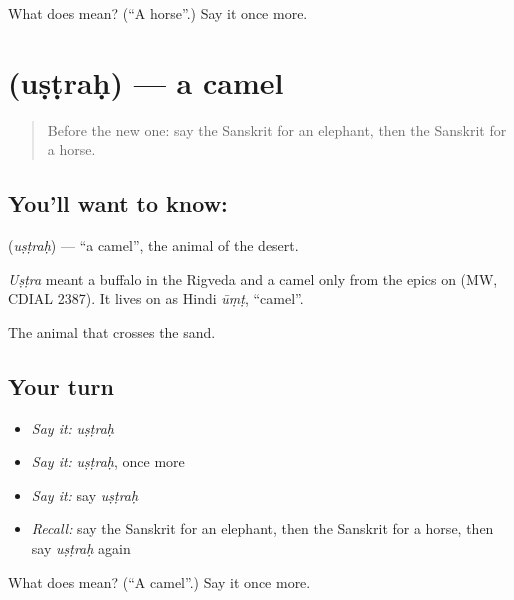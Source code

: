 \begin{tcolorbox}[breakable,colback=teal!4,colframe=teal!35!black,title={Before you move on}]
What does  mean? (\textquotedblleft{}A horse\textquotedblright{}.) Say it once more.
\end{tcolorbox}
\section[\texorpdfstring{\sk{उष्ट्रः} (uṣṭraḥ)}{उष्ट्रः (uṣṭraḥ)}]{ (uṣṭraḥ) — a camel}

\label{lesson:SA-C79-camel}



\begin{quote}
Before the new one: say the Sanskrit for an elephant, then the Sanskrit for a horse.
\end{quote}

\subsection*{You'll want to know: }
\textbf{} (\emph{uṣṭraḥ}) — \textquotedblleft{}a camel\textquotedblright{}, the animal of the desert.

\begin{cousinweb}
\emph{Uṣṭra} meant a buffalo in the Rigveda and a camel only from the epics on (MW, CDIAL 2387). It lives on as Hindi \emph{ūṃṭ}, \textquotedblleft{}camel\textquotedblright{}.
\end{cousinweb}

\begin{grammarlens}[title={What you've built}]
The animal that crosses the sand.
\end{grammarlens}

\subsection*{Your turn}
\begin{itemize}
\raggedright
  \item \emph{Say it:} \emph{uṣṭraḥ}
  \item \emph{Say it:} \emph{uṣṭraḥ}, once more
  \item \emph{Say it:} say \emph{uṣṭraḥ}
  \item \emph{Recall:} say the Sanskrit for an elephant, then the Sanskrit for a horse, then say \emph{uṣṭraḥ} again
\end{itemize}

\begin{tcolorbox}[breakable,colback=teal!4,colframe=teal!35!black,title={Before you move on}]
What does  mean? (\textquotedblleft{}A camel\textquotedblright{}.) Say it once more.
\end{tcolorbox}

